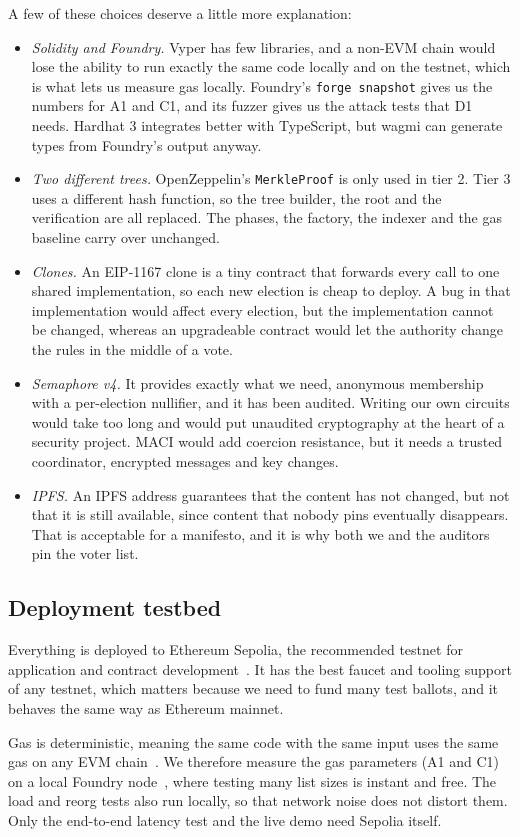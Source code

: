 A few of these choices deserve a little more explanation:

\begin{itemize}
  \item \emph{Solidity and Foundry.} Vyper has few libraries, and a non-EVM
        chain would lose the ability to run exactly the same code locally and
        on the testnet, which is what lets us measure gas locally. Foundry's
        \texttt{forge snapshot} gives us the numbers for A1 and C1, and its
        fuzzer gives us the attack tests that D1 needs. Hardhat 3 integrates
        better with TypeScript, but wagmi can generate types from Foundry's
        output anyway.
  \item \emph{Two different trees.} OpenZeppelin's \texttt{MerkleProof} is only
        used in tier 2. Tier 3 uses a different hash function, so the tree
        builder, the root and the verification are all replaced. The phases,
        the factory, the indexer and the gas baseline carry over unchanged.
  \item \emph{Clones.} An EIP-1167 clone is a tiny contract that forwards every
        call to one shared implementation, so each new election is cheap to
        deploy. A bug in that implementation would affect every election, but
        the implementation cannot be changed, whereas an upgradeable contract
        would let the authority change the rules in the middle of a vote.
  \item \emph{Semaphore v4.} It provides exactly what we need, anonymous
        membership with a per-election nullifier, and it has been audited.
        Writing our own circuits would take too long and would put unaudited
        cryptography at the heart of a security project. MACI would add
        coercion resistance, but it needs a trusted coordinator, encrypted
        messages and key changes.
  \item \emph{IPFS.} An IPFS address guarantees that the content has not
        changed, but not that it is still available, since content that nobody
        pins eventually disappears. That is acceptable for a manifesto, and it
        is why both we and the auditors pin the voter list.
\end{itemize}

\subsection{Deployment testbed}

Everything is deployed to Ethereum Sepolia, the recommended testnet for
application and contract development~\cite{sepolia}. It has the best faucet and
tooling support of any testnet, which matters because we need to fund many
test ballots, and it behaves the same way as Ethereum mainnet.

Gas is deterministic, meaning the same code with the same input uses the same
gas on any EVM chain~\cite{ethgas}. We therefore measure the gas parameters (A1
and C1) on a local Foundry node~\cite{foundry}, where testing many list sizes is
instant and free. The load and reorg tests also run locally, so that network
noise does not distort them. Only the end-to-end latency test and the live demo
need Sepolia itself.
